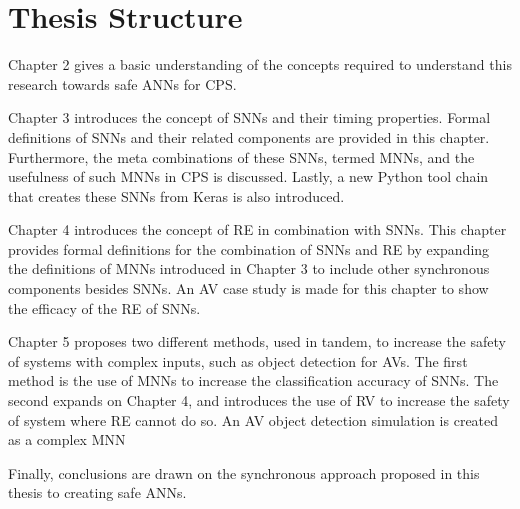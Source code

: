 \section{Thesis Structure}
Chapter 2 gives a basic understanding of the concepts required to understand this research towards safe \acp{ANN} for \ac{CPS}.

Chapter 3 introduces the concept of \acfp{SNN} and their timing properties.
Formal definitions of \acp{SNN} and their related components are provided in this chapter.
Furthermore, the meta combinations of these \acp{SNN}, termed \acp{MNN}, and the usefulness of such \acp{MNN} in \ac{CPS} is discussed.
Lastly, a new Python tool chain that creates these \acp{SNN} from Keras is also introduced.

Chapter 4 introduces the concept of \acf{RE} in combination with \acp{SNN}. 
This chapter provides formal definitions for the combination of \acp{SNN} and \ac{RE} by expanding the definitions of \acp{MNN} introduced in Chapter 3 to include other synchronous components besides \acp{SNN}.
An \acf{AV} case study is made for this chapter to show the efficacy of the \ac{RE} of \acp{SNN}.

Chapter 5 proposes two different methods, used in tandem, to increase the safety of systems with complex inputs, such as object detection for \acp{AV}.
The first method is the use of \acp{MNN} to increase the classification accuracy of \acp{SNN}.
The second expands on Chapter 4, and introduces the use of \ac{RV} to increase the safety of system where \ac{RE} cannot do so.
An \ac{AV} object detection simulation is created as a complex \ac{MNN} 

Finally, conclusions are drawn on the synchronous approach proposed in this thesis to creating safe \acp{ANN}.

